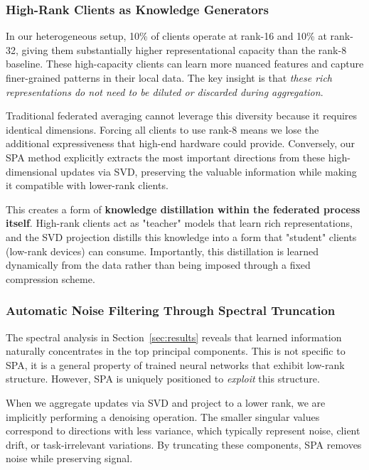\documentclass[conference]{IEEEtran}
\begin{document}
\subsubsection{High-Rank Clients as Knowledge Generators}

In our heterogeneous setup, 10\% of clients operate at rank-16 and 10\% at rank-32, giving them substantially higher representational capacity than the rank-8 baseline. These high-capacity clients can learn more nuanced features and capture finer-grained patterns in their local data. The key insight is that \textit{these rich representations do not need to be diluted or discarded during aggregation}.

Traditional federated averaging cannot leverage this diversity because it requires identical dimensions. Forcing all clients to use rank-8 means we lose the additional expressiveness that high-end hardware could provide. Conversely, our SPA method explicitly extracts the most important directions from these high-dimensional updates via SVD, preserving the valuable information while making it compatible with lower-rank clients.

This creates a form of \textbf{knowledge distillation within the federated process itself}. High-rank clients act as "teacher" models that learn rich representations, and the SVD projection distills this knowledge into a form that "student" clients (low-rank devices) can consume. Importantly, this distillation is learned dynamically from the data rather than being imposed through a fixed compression scheme.

\subsubsection{Automatic Noise Filtering Through Spectral Truncation}

The spectral analysis in Section~\ref{sec:results} reveals that learned information naturally concentrates in the top principal components. This is not specific to SPA, it is a general property of trained neural networks that exhibit low-rank structure. However, SPA is uniquely positioned to \textit{exploit} this structure.

When we aggregate updates via SVD and project to a lower rank, we are implicitly performing a denoising operation. The smaller singular values correspond to directions with less variance, which typically represent noise, client drift, or task-irrelevant variations. By truncating these components, SPA removes noise while preserving signal.
\end{document}
